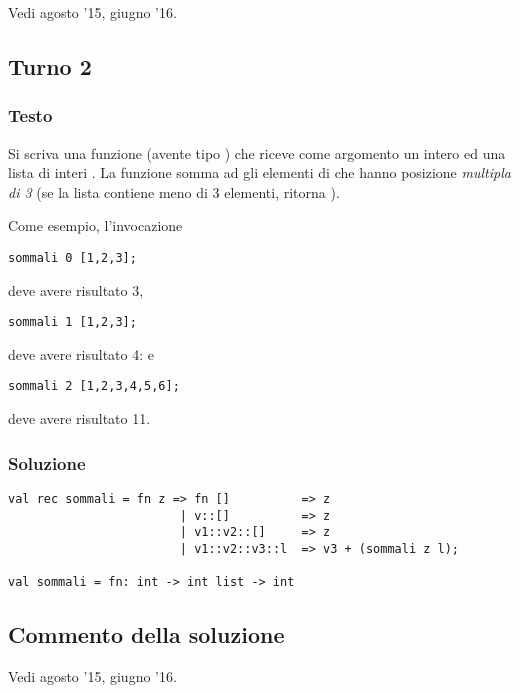 Vedi agosto '15, giugno '16.


\subsection{Turno 2}

\subsubsection{Testo}

Si scriva una funzione  (avente tipo ) che riceve come argomento un intero  ed una lista di interi .
La funzione  somma ad  gli elementi di  che hanno posizione \emph{multipla di 3} (se la lista contiene meno di 3 elementi,  ritorna ).

\medskip
Come esempio, l'invocazione
\begin{lstlisting}
sommali 0 [1,2,3];
\end{lstlisting}

deve avere risultato 3,
\begin{lstlisting}
sommali 1 [1,2,3];
\end{lstlisting}

deve avere risultato 4: e
\begin{lstlisting}
sommali 2 [1,2,3,4,5,6];
\end{lstlisting}

deve avere risultato 11.

\subsubsection{Soluzione}

\begin{lstlisting}[style = SML, caption = {[Definizione della funzione \sml{sommali} - Turno 2]Definizione della funzione \sml{sommali}}]
val rec sommali = fn z => fn []          => z
						| v::[]          => z
						| v1::v2::[]     => z
						| v1::v2::v3::l  => v3 + (sommali z l);

val sommali = fn: int -> int list -> int
\end{lstlisting}

\subsection{Commento della soluzione}

Vedi agosto '15, giugno '16.
